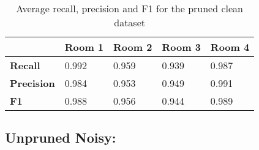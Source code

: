\begin{table}[H]
\small\addtolength{\tabcolsep}{-5pt}
\centering
\begin{tabular}{|l|l|l|l|l|}
\hline
\rowcolor[HTML]{EFEFEF} 
                                           & \textbf{Room 1} & \textbf{Room 2} & \textbf{Room 3} & \textbf{Room 4} \\ \hline
\cellcolor[HTML]{EFEFEF}\textbf{Recall}    & 0.992           & 0.959           & 0.939           & 0.987           \\ \hline
\cellcolor[HTML]{EFEFEF}\textbf{Precision} & 0.984           & 0.953           & 0.949           & 0.991           \\ \hline
\cellcolor[HTML]{EFEFEF}\textbf{F1}        & 0.988           & 0.956           & 0.944           & 0.989           \\ \hline
\end{tabular}
\caption[Metrics for Clean Pruned]{Average recall, precision and F1 for the pruned clean dataset}
\label{tab:RPF_pruned_clean}
\end{table}

\newpage

\subsection{Unpruned Noisy:}\\
\label{sec:data_unpruned_noisy}



